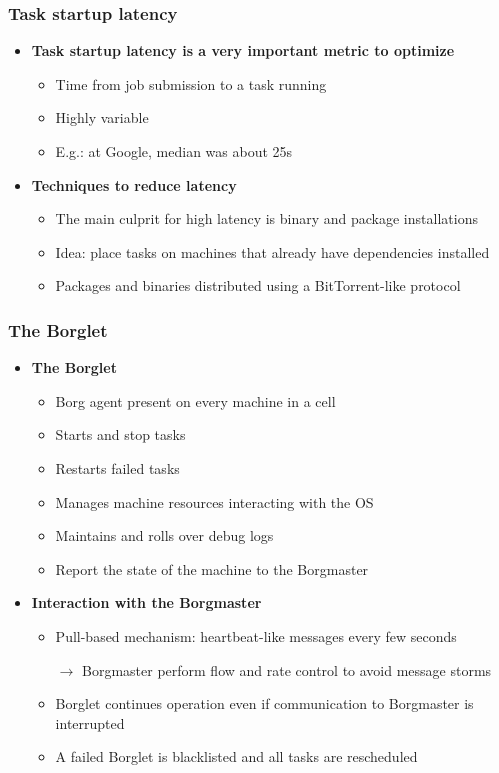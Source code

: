 \begin{frame}
\frametitle{Task startup latency}
\begin{itemize}
	\item {\bf Task startup latency is a very important metric to optimize}
	\begin{itemize}
		\item Time from job submission to a task running
		\item Highly variable
		\item E.g.: at Google, median was about 25s
	\end{itemize}

\vspace{20pt}

	\item {\bf Techniques to reduce latency}
	\begin{itemize}
		\item The main culprit for high latency is binary and package installations
		\item Idea: place tasks on machines that already have dependencies installed
		\item Packages and binaries distributed using a BitTorrent-like protocol
	\end{itemize}
\end{itemize}
\end{frame}

\begin{frame}
\frametitle{The Borglet}
\begin{itemize}
	\item {\bf The Borglet}
	\begin{itemize}
		\item Borg agent present on every machine in a cell
		\item Starts and stop tasks
		\item Restarts failed tasks
		\item Manages machine resources interacting with the OS
		\item Maintains and rolls over debug logs
		\item Report the state of the machine to the Borgmaster
	\end{itemize}

\vspace{20pt}

	\item {\bf Interaction with the Borgmaster}
	\begin{itemize}
		\item Pull-based mechanism: heartbeat-like messages every few seconds
		\item[$\to$] Borgmaster perform flow and rate control to avoid message storms
		\item Borglet continues operation even if communication to Borgmaster is interrupted
		\item A failed Borglet is blacklisted and all tasks are rescheduled
	\end{itemize}
\end{itemize}
\end{frame}

